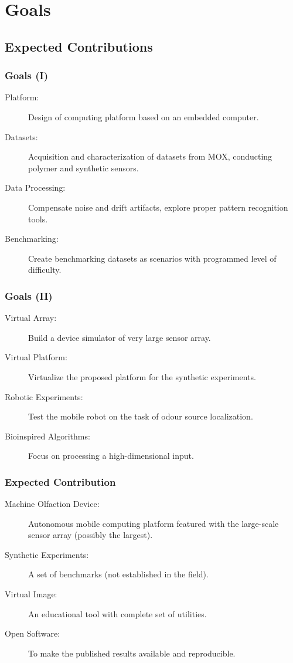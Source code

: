 \documentclass{beamer}
\begin{document}
\section{Goals}

\subsection{Expected Contributions}

\begin{frame}
\frametitle{Goals (I)}
\begin{description}
  \item[Platform:] Design of computing platform based on an embedded computer.
  \item[Datasets:] Acquisition and characterization of datasets from MOX, conducting polymer and synthetic sensors.  
  \item[Data Processing:] Compensate noise and drift artifacts, explore proper pattern recognition tools.
  \item[Benchmarking:] Create benchmarking datasets as scenarios with programmed level of difficulty.    
\end{description}
\end{frame}

\begin{frame}
\frametitle{Goals (II)}
\begin{description} 
  \item[Virtual Array:] Build a device simulator of very large sensor array.  
  \item[Virtual Platform:] Virtualize the proposed platform for the synthetic experiments.  
  \item[Robotic Experiments:] Test the mobile robot on the task of odour source localization.
  \item[Bioinspired Algorithms:] Focus on processing a high-dimensional input.  
\end{description}
\end{frame}

\begin{frame}
\frametitle{Expected Contribution}
\begin{description} 
  \item[Machine Olfaction Device:] Autonomous mobile computing platform featured with the large-scale sensor array (possibly the largest).
  \item[Synthetic Experiments:] A set of benchmarks (not established in the field).
  \item[Virtual Image:] An educational tool with complete set of utilities.
  \item[Open Software:] To make the published results available and reproducible.
\end{description}
\end{frame}
\end{document}
